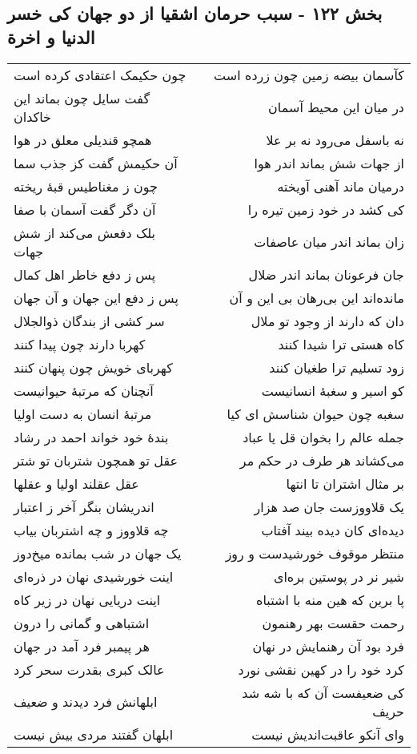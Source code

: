 \begin{center}
\section*{بخش ۱۲۲ - سبب حرمان اشقیا از دو جهان کی خسر الدنیا و اخرة}
\label{sec:sh122}
\begin{longtable}{l p{0.5cm} r}
چون حکیمک اعتقادی کرده است
&&
کآسمان بیضه زمین چون زرده است
\\
گفت سایل چون بماند این خاکدان
&&
در میان این محیط آسمان
\\
همچو قندیلی معلق در هوا
&&
نه باسفل می‌رود نه بر علا
\\
آن حکیمش گفت کز جذب سما
&&
از جهات شش بماند اندر هوا
\\
چون ز مغناطیس قبهٔ ریخته
&&
درمیان ماند آهنی آویخته
\\
آن دگر گفت آسمان با صفا
&&
کی کشد در خود زمین تیره را
\\
بلک دفعش می‌کند از شش جهات
&&
زان بماند اندر میان عاصفات
\\
پس ز دفع خاطر اهل کمال
&&
جان فرعونان بماند اندر ضلال
\\
پس ز دفع این جهان و آن جهان
&&
مانده‌اند این بی‌رهان بی این و آن
\\
سر کشی از بندگان ذوالجلال
&&
دان که دارند از وجود تو ملال
\\
کهربا دارند چون پیدا کنند
&&
کاه هستی ترا شیدا کنند
\\
کهربای خویش چون پنهان کنند
&&
زود تسلیم ترا طغیان کنند
\\
آنچنان که مرتبهٔ حیوانیست
&&
کو اسیر و سغبهٔ انسانیست
\\
مرتبهٔ انسان به دست اولیا
&&
سغبه چون حیوان شناسش ای کیا
\\
بندهٔ خود خواند احمد در رشاد
&&
جمله عالم را بخوان قل یا عباد
\\
عقل تو همچون شتربان تو شتر
&&
می‌کشاند هر طرف در حکم مر
\\
عقل عقلند اولیا و عقلها
&&
بر مثال اشتران تا انتها
\\
اندریشان بنگر آخر ز اعتبار
&&
یک قلاووزست جان صد هزار
\\
چه قلاووز و چه اشتربان بیاب
&&
دیده‌ای کان دیده بیند آفتاب
\\
یک جهان در شب بمانده میخ‌دوز
&&
منتظر موقوف خورشیدست و روز
\\
اینت خورشیدی نهان در ذره‌ای
&&
شیر نر در پوستین بره‌ای
\\
اینت دریایی نهان در زیر کاه
&&
پا برین که هین منه با اشتباه
\\
اشتباهی و گمانی را درون
&&
رحمت حقست بهر رهنمون
\\
هر پیمبر فرد آمد در جهان
&&
فرد بود آن رهنمایش در نهان
\\
عالک کبری بقدرت سحر کرد
&&
کرد خود را در کهین نقشی نورد
\\
ابلهانش فرد دیدند و ضعیف
&&
کی ضعیفست آن که با شه شد حریف
\\
ابلهان گفتند مردی بیش نیست
&&
وای آنکو عاقبت‌اندیش نیست
\\
\end{longtable}
\end{center}
